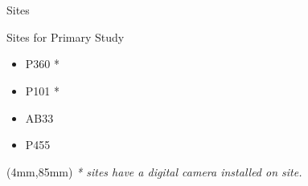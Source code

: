 \documentclass{beamer}
\newenvironment{reference}[2]{%
  \begin{textblock*}{\textwidth}(#1,#2) 
      \footnotesize\it\bgroup\color{red!50!black}}{\egroup\end{textblock*}}
\begin{document}
\section[Sites]{}
\begin{frame}{Sites}

Sites for Primary Study
\begin{itemize}
  \item P360 *
  \item P101 *
  \item AB33
  \item P455
\end{itemize}

   \begin{reference}{4mm}{85mm}
     * sites have a digital camera installed on site.
   \end{reference} 
 
\end{frame}
\end{document}
